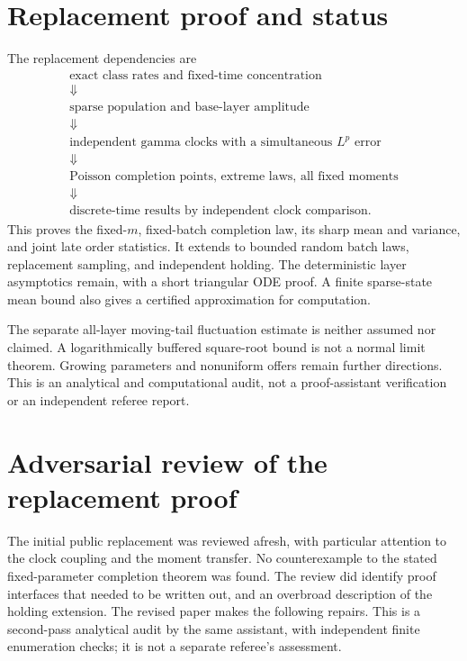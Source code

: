\documentclass[11pt]{article}
\begin{document}
\section{Replacement proof and status}
The replacement dependencies are
\[
\begin{gathered}
 \text{exact class rates and fixed-time concentration}\\
 \Downarrow\\
 \text{sparse population and base-layer amplitude}\\
 \Downarrow\\
 \text{independent gamma clocks with a simultaneous }L^p\text{ error}\\
 \Downarrow\\
 \text{Poisson completion points, extreme laws, all fixed moments}\\
 \Downarrow\\
 \text{discrete-time results by independent clock comparison.}
\end{gathered}
\]
This proves the fixed-$m$, fixed-batch completion law, its sharp mean and
variance, and joint late order statistics. It extends to bounded random
batch laws, replacement sampling, and independent holding. The deterministic
layer asymptotics remain, with a short triangular ODE proof. A finite
sparse-state mean bound also gives a certified approximation for computation.

The separate all-layer moving-tail fluctuation estimate is neither assumed
nor claimed. A logarithmically buffered square-root bound is not a normal
limit theorem. Growing parameters and nonuniform offers remain further
directions. This is an analytical and computational audit, not a
proof-assistant verification or an independent referee report.

\section{Adversarial review of the replacement proof}
The initial public replacement was reviewed afresh, with particular attention
to the clock coupling and the moment transfer. No counterexample to the
stated fixed-parameter completion theorem was found. The review did identify
proof interfaces that needed to be written out, and an overbroad description
of the holding extension. The revised paper makes the following repairs.
This is a second-pass analytical audit by the same assistant, with independent
finite enumeration checks; it is not a separate referee's assessment.
\end{document}
